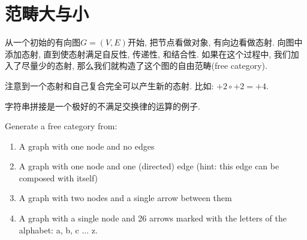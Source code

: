 \documentclass[lang=cn]{elegantbook}
\begin{document}
\chapter{范畴大与小}
从一个初始的有向图$G = (V, E)$开始, 把节点看做对象, 有向边看做态射. 向图中添加态射, 直到使态射满足自反性, 传递性, 和结合性. 如果在这个过程中, 我们加入了尽量少的态射, 那么我们就构造了这个图的自由范畴(free category).

注意到一个态射和自己复合完全可以产生新的态射. 比如: $+2 \circ +2 = +4$.

字符串拼接是一个极好的不满足交换律的运算的例子.

\begin{exercise}
Generate a free category from:
\begin{enumerate}
    \item A graph with one node and no edges
    \item A graph with one node and one (directed) edge (hint: this edge can be composed with itself)
    \item A graph with two nodes and a single arrow between them
    \item A graph with a single node and 26 arrows marked with the letters of the alphabet: a, b, c ... z.

\end{enumerate}
\end{exercise}
\end{document}
